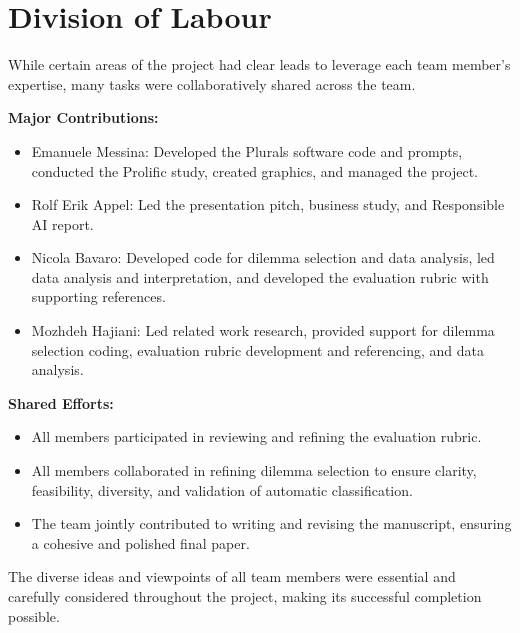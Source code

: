 \section{Division of Labour}

While certain areas of the project had clear leads to leverage each team member's expertise, many tasks were collaboratively shared across the team.

\textbf{Major Contributions:}
\begin{itemize}
  \item {Emanuele Messina:} Developed the Plurals software code and prompts, conducted the Prolific study, created graphics, and managed the project.
  \item {Rolf Erik Appel:} Led the presentation pitch, business study, and Responsible AI report.
  \item {Nicola Bavaro:} Developed code for dilemma selection and data analysis, led data analysis and interpretation, and developed the evaluation rubric with supporting references.
  \item {Mozhdeh Hajiani:} Led related work research, provided support for dilemma selection coding, evaluation rubric development and referencing, and data analysis.
\end{itemize}

\textbf{Shared Efforts:}
\begin{itemize}
  \item All members participated in reviewing and refining the evaluation rubric.
  \item All members collaborated in refining dilemma selection to ensure clarity, feasibility, diversity, and validation of automatic classification.
  \item The team jointly contributed to writing and revising the manuscript, ensuring a cohesive and polished final paper.
\end{itemize}

The diverse ideas and viewpoints of all team members were essential and carefully considered throughout the project, making its successful completion possible.
